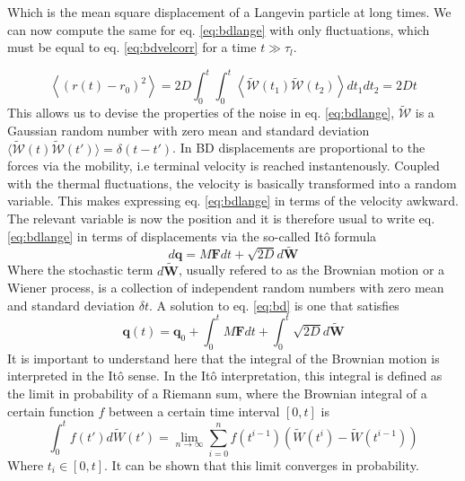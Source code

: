 \documentclass[ twoside,openright,titlepage,numbers=noenddot,%
headinclude,footinclude,cleardoublepage=empty,abstract=on,
BCOR=5mm,paper=a4,fontsize=11pt, dvipsnames
]{scrreprt}
\renewcommand{\vec}[1]{\bm{#1}}
\newcommand{\dt}{\delta t}
\newcommand{\noise}{\widetilde{W}}
\newcommand{\ppos}{q}
\begin{document}
Which is the mean square displacement of a Langevin particle at long times.
We can now compute the same for eq. \eqref{eq:bdlange} with only fluctuations, which must be equal to eq. \eqref{eq:bdvelcorr} for a time $t \gg \tau_l$.

\begin{equation}
  \label{eq:bdmsd}
  \left\langle (r(t)-r_0)^2 \right\rangle = 2D\int_0^{t}{\int_0^{t}{\left\langle\mathcal{\noise}(t_1)\mathcal{\noise}(t_2)\right\rangle dt_1dt_2}} = 2Dt
\end{equation}
This allows us to devise the properties of the noise in eq. \eqref{eq:bdlange}, $\mathcal{\noise}$ is a Gaussian random number with zero mean and standard deviation $\langle\mathcal{\noise}(t)\mathcal{\noise}(t')\rangle = \delta(t-t')$.
In \gls{BD} displacements are proportional to the forces via the mobility, i.e terminal velocity is reached instantenously.
Coupled with the thermal fluctuations, the velocity is basically transformed into a random variable. This makes expressing eq. \eqref{eq:bdlange} in terms of the velocity awkward. The relevant variable is now the position and it is therefore usual to write eq. \eqref{eq:bdlange} in terms of displacements via the so-called Itô formula
\begin{equation}
  \label{eq:bd}
  d\vec{\ppos} = M\vec{F}dt + \sqrt{2D}d\vec{\noise}
\end{equation}
Where the stochastic term $d\vec{\noise}$, usually refered to as the Brownian motion or a Wiener process, is a collection of independent random numbers with zero mean and standard deviation $\dt$.
A solution to eq. \eqref{eq:bd} is one that satisfies
\begin{equation}
  \label{eq:bddis}
  \vec{\ppos}(t) = \vec{\ppos}_0 + \int_0^tM\vec{F}dt + \int_0^t\sqrt{2D}d\vec{\noise}
\end{equation}
It is important to understand here that the integral of the Brownian motion is interpreted in the Itô sense.
In the Itô interpretation, this integral is defined as the limit in probability of a Riemann sum, where the Brownian integral of a certain function $f$ between a certain time interval $[0, t]$ is
\begin{equation}
  \label{eq:itonoise}
  \int_0^tf(t')d\noise(t') = \lim_{n\rightarrow\infty}\sum_{i=0}^nf(t^{i-1}) (\noise(t^i) - \noise({t^{i-1}}))
\end{equation}
Where $t_i\in [0, t]$.
It can be shown that this limit converges in probability\cite{itoconvergence}.
\end{document}
